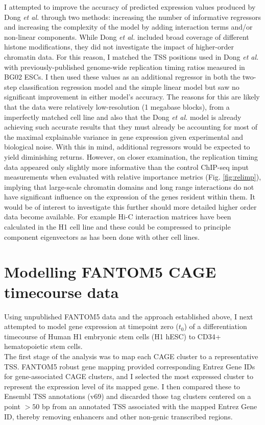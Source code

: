 \documentclass[a4paper,11pt,oneside]{book}
\begin{document}
I attempted to improve the accuracy of predicted expression values
produced by Dong \emph{et al.} through two methods: increasing the number of informative
regressors and increasing the complexity of the model by adding
interaction terms and/or non-linear components. While Dong \emph{et
  al.} included broad coverage of different histone modifications,
they did not investigate the impact of higher-order
chromatin data. For this reason, I matched the TSS positions used in
Dong \emph{et al.} with previously-published genome-wide replication
timing ratios measured in BG02 ESCs.\cite{Ryba2010} I then used these values as an additional
regressor in both the two-step classification regression model and the
simple linear model but saw no significant improvement in either
model's accuracy. The reasons for this are likely that the 
data were relatively low-resolution (1 megabase blocks), from a
imperfectly matched cell line and also that
the Dong \emph{et al.} model is already achieving such accurate
results that they must already be accounting for most of the maximal
explainable variance in gene expression given experimental and
biological noise. With this in mind, additional regressors would be
expected to yield diminishing returns. However, on closer examination,
the replication timing data
appeared only slightly more informative than the control ChIP-seq input
measurements when evaluated with relative importance metrics
(Fig. \ref{fig:relimp}), implying that large-scale chromatin domains
and long range interactions
do not have significant influence on the expression of the genes resident within them. It would
be of interest to investigate this further should more detailed higher order
data become available. For example Hi-C interaction matrices have been
calculated in the H1 cell line\cite{Dixon2012} and these could be
compressed to principle component eigenvectors as has been done with
other cell lines.\cite{Lieberman2011}

\section{Modelling FANTOM5 CAGE timecourse data}
Using unpublished FANTOM5 data and the approach established above, I next attempted to model gene
expression at timepoint zero ($t_0$) of a differentiation timecourse of Human
H1 embryonic stem cells (H1 hESC) to CD34+ hematopoietic stem
cells. \\

The first stage of the analysis was to map each CAGE cluster to a
representative TSS. FANTOM5 robust gene mapping\cite{fantom5}
provided corresponding Entrez Gene IDs for gene-associated CAGE
clusters, and I selected the most expressed cluster to represent the
expression level of its mapped gene. I then compared these to Ensembl
TSS annotations (v69) and
discarded those tag clusters centered on a point $>50$ bp from an annotated
TSS associated with the mapped Entrez Gene ID, thereby removing enhancers and other non-genic transcribed
regions. \\
\end{document}
